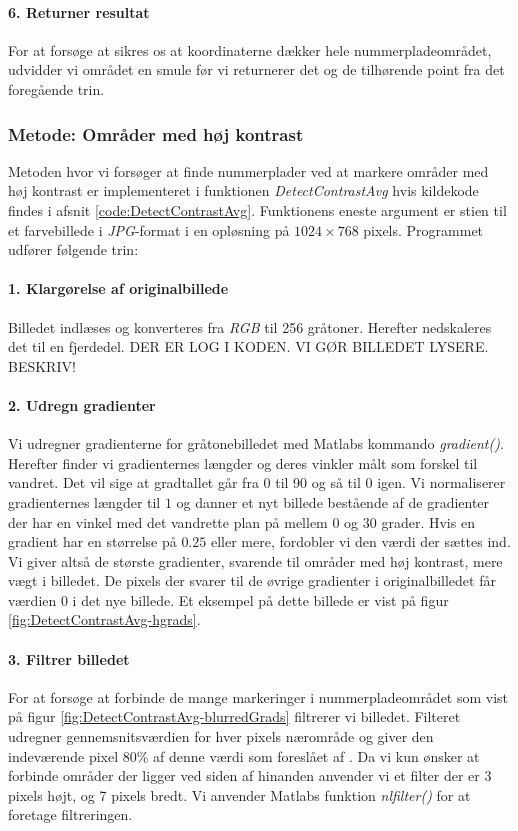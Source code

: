 \paragraph{6. Returner resultat}
For at forsøge at sikres os at koordinaterne dækker hele nummerpladeområdet, udvidder vi området en smule før vi returnerer det og de tilhørende point fra det foregående trin. 


\subsubsection{Metode: Områder med høj kontrast}
Metoden hvor vi forsøger at finde nummerplader ved at markere områder med høj kontrast er implementeret i funktionen \textit{DetectContrastAvg} hvis kildekode findes i afsnit \vref{code:DetectContrastAvg}. Funktionens eneste argument er stien til et farvebillede i \textit{JPG}-format i en opløsning på $1024 \times 768$ pixels. Programmet udfører følgende trin:

\paragraph{1. Klargørelse af originalbillede}
Billedet indlæses og konverteres fra \textit{RGB} til 256 gråtoner. Herefter nedskaleres det til en fjerdedel. DER ER LOG I KODEN. VI GØR BILLEDET LYSERE. BESKRIV!

\paragraph{2. Udregn gradienter}
Vi udregner gradienterne for gråtonebilledet med Matlabs kommando \textit{gradient()}. Herefter finder vi gradienternes længder og deres vinkler målt som forskel til vandret. Det vil sige at gradtallet går fra 0 til 90 og så til 0 igen. Vi normaliserer gradienternes længder til $1$ og danner et nyt billede bestående af de gradienter der har en vinkel med det vandrette plan på mellem $0$ og $30$ grader. Hvis en gradient har en størrelse på $0.25$ eller mere, fordobler vi den værdi der sættes ind. Vi giver altså de største gradienter, svarende til områder med høj kontrast, mere vægt i billedet. De pixels der svarer til de øvrige gradienter i originalbilledet får værdien $0$ i det nye billede. Et eksempel på dette billede er vist på figur \vref{fig:DetectContrastAvg-hgrads}.

\paragraph{3. Filtrer billedet}
For at forsøge at forbinde de mange markeringer i nummerpladeområdet som vist på figur \vref{fig:DetectContrastAvg-blurredGrads} filtrerer vi billedet. Filteret udregner gennemsnitsværdien for hver pixels nærområde og giver den indeværende pixel 80\% af denne værdi som foreslået af \cite{shapiro}. Da vi kun ønsker at forbinde områder der ligger ved siden af hinanden anvender vi et filter der er 3 pixels højt, og 7 pixels bredt. Vi anvender Matlabs funktion \textit{nlfilter()} for at foretage filtreringen.

